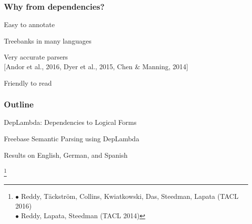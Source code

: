\documentclass[mathserif,12pt]{beamer}
\newcommand\blfootnote[1]{%
  \begingroup
  \renewcommand\thefootnote{}\footnote{#1}%
  \addtocounter{footnote}{-1}%
  \endgroup
}
\begin{document}
\begin{frame}

\end{frame}

\begin{frame}
\frametitle{Why from dependencies?}
\large

Easy to annotate

\vspace{2em}
Treebanks in many languages

\vspace{2em}
Very accurate parsers\\
{\footnotesize [Andor et al., 2016, Dyer et al., 2015, Chen \& Manning, 2014]}


\vspace{2em}
Friendly to read
\end{frame}

\begin{frame}
\frametitle{Outline}
\large 
DepLambda: Dependencies to Logical Forms
 
\vspace{2em}
Freebase Semantic Parsing using DepLambda

\vspace{2em}
Results on English, German, and Spanish

\blfootnote{
\color{blue}
 $\bullet$ Reddy, T\"ackstr\"om, Collins, Kwiatkowski, Das, Steedman, Lapata (TACL 2016) \\
 \hspace{1.5em} $\bullet$ Reddy, Lapata, Steedman (TACL 2014)
}
\end{frame}
\end{document}
